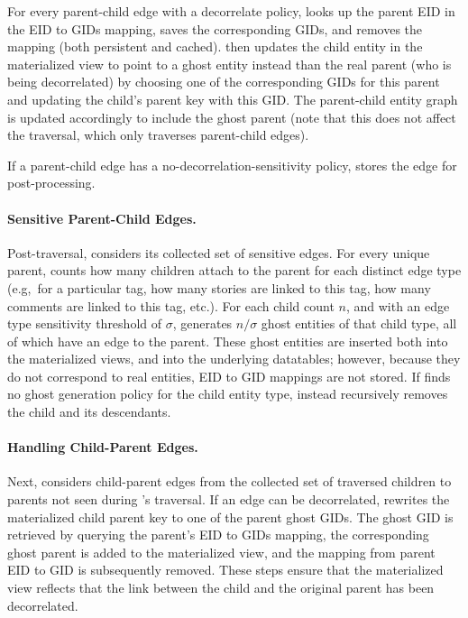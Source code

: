 For every parent-child edge with a decorrelate policy, \name looks up the parent EID in the
EID to GIDs mapping, saves the corresponding GIDs, and removes the mapping (both persistent and
cached).
\name then updates the child entity in the materialized view to point to a ghost entity instead
than the real parent (who is being decorrelated) by choosing one of the corresponding GIDs for this
parent and updating the child's parent key with this GID.  The parent-child entity graph is updated
accordingly to include the ghost parent (note that this does not affect the traversal, which only
traverses parent-child edges).

If a parent-child edge has a no-decorrelation-sensitivity policy, \name stores the edge for
post-processing.

\paragraph{Sensitive Parent-Child Edges.}
Post-traversal, \name considers its collected set of sensitive edges. For every unique parent,
\name counts how many children attach to the parent for each distinct edge type (e.g,\ for a
particular tag, how many stories are linked to this tag, how many comments are linked to this tag,
etc.). For each child count $n$, and with an edge type sensitivity threshold of $\sigma$, 
\name generates $n / \sigma$ ghost entities of that child type, all of which have an edge to the parent.
These ghost entities are inserted both into the materialized views, and into the underlying
datatables; however, because they do not correspond to real entities, EID to GID mappings are not
stored. 
If \name finds no ghost generation policy for the child entity type, \name instead recursively
removes the child and its descendants.

\paragraph{Handling Child-Parent Edges.}
Next, \name considers child-parent edges from the collected set of traversed children to parents
not seen during \name's traversal. If an 
edge can be decorrelated, \name rewrites the materialized child parent key to one of the parent
ghost GIDs. The ghost GID is retrieved by querying the parent's EID to GIDs mapping, the
corresponding ghost parent is added to the materialized view,
and the mapping from parent EID to GID is subsequently removed. These steps ensure that the
materialized view reflects that the link between the child and the original parent has been
decorrelated.

